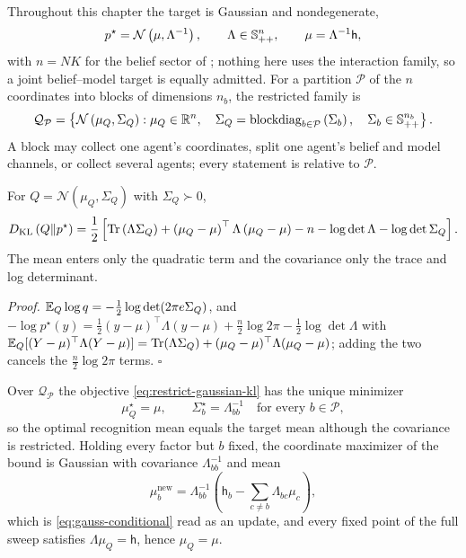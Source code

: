 Throughout this chapter the target is Gaussian and nondegenerate,
\begin{equation}
p^\star=\mathcal N\left(\mu,\Lambda^{-1}\right),
\qquad
\Lambda\in\mathbb S_{++}^{n},
\qquad
\mu=\Lambda^{-1}\mathsf h,
\label{eq:restrict-gaussian-target}
\end{equation}
with \(n=NK\) for the belief sector of ; nothing here uses
the interaction family, so a joint belief--model target is equally admitted.
For a partition \(\mathcal P\) of the \(n\) coordinates into blocks of
dimensions \(n_b\), the restricted family is
\begin{equation}
\mathcal Q_{\mathcal P}
=\left\{\mathcal N\left(\mu_Q,\Sigma_Q\right):
\mu_Q\in\mathbb R^{n},
\quad
\Sigma_Q=\operatorname{blockdiag}_{b\in\mathcal P}\left(\Sigma_b\right),
\quad
\Sigma_b\in\mathbb S_{++}^{n_b}\right\}.
\label{eq:restrict-block-family}
\end{equation}
A block may collect one agent's coordinates, split one agent's belief and model
channels, or collect several agents; every statement is relative to
\(\mathcal P\).

For \(Q=\mathcal N(\mu_Q,\Sigma_Q)\) with \(\Sigma_Q\succ0\),
\begin{equation}
D_{\mathrm{KL}}\left(Q\Vert p^\star\right)
=\frac12\left[
\operatorname{Tr}\left(\Lambda\Sigma_Q\right)
+\left(\mu_Q-\mu\right)^\top\Lambda\left(\mu_Q-\mu\right)
-n
-\log\det\Lambda
-\log\det\Sigma_Q
\right].
\label{eq:restrict-gaussian-kl}
\end{equation}
The mean enters only the quadratic term and the covariance only the trace and
log determinant. 

\noindent\emph{Proof.}
\(\mathbb E_Q\log q=-\tfrac12\log\det(2\pi e\Sigma_Q)\), and
\(-\log p^\star(y)=\tfrac12(y-\mu)^\top\Lambda(y-\mu)+\tfrac n2\log2\pi-\tfrac12\log\det\Lambda\)
with \(\mathbb E_Q[(Y-\mu)^\top\Lambda(Y-\mu)]=\operatorname{Tr}(\Lambda\Sigma_Q)+(\mu_Q-\mu)^\top\Lambda(\mu_Q-\mu)\);
adding the two cancels the \(\tfrac n2\log2\pi\) terms. \(\square\)

Over \(\mathcal Q_{\mathcal P}\) the objective \eqref{eq:restrict-gaussian-kl}
has the unique minimizer
\begin{equation}
\mu_Q^\star=\mu,
\qquad
\Sigma_b^\star=\Lambda_{bb}^{-1}
\quad\text{for every }b\in\mathcal P,
\label{eq:restrict-block-optimum}
\end{equation}
so the optimal recognition mean equals the target mean although the covariance is
restricted. Holding every factor but \(b\) fixed, the coordinate maximizer of
the bound is Gaussian with covariance \(\Lambda_{bb}^{-1}\) and mean
\begin{equation}
\mu_b^{\mathrm{new}}
=\Lambda_{bb}^{-1}\left(\mathsf h_b-\sum_{c\neq b}\Lambda_{bc}\mu_c\right),
\label{eq:restrict-cavi-mean}
\end{equation}
which is \eqref{eq:gauss-conditional} read as an update, and every fixed point
of the full sweep satisfies \(\Lambda\mu_Q=\mathsf h\), hence \(\mu_Q=\mu\).

